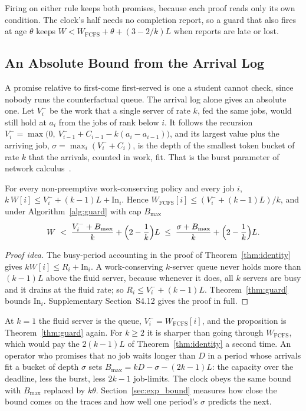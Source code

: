 Firing on either rule keeps both promises, because each proof reads only its own
condition. The clock's half needs no completion report, so a guard that also fires at
age $\theta$ keeps $W < W_{\mathrm{FCFS}} + \theta + (3-2/k)L$ when reports are late
or lost.

\subsection{An Absolute Bound from the Arrival Log}
\label{sec:absolute}

A promise relative to first-come first-served is one a student cannot check, since
nobody runs the counterfactual queue. The arrival log alone gives an absolute one. Let
$V_i^-$ be the work that a single server of rate $k$, fed the same jobs, would still hold
at $a_i$ from the jobs of rank below $i$. It follows the recursion
$V_i^- = \max\bigl(0,\ V_{i-1}^- + C_{i-1} - k(a_i - a_{i-1})\bigr)$, and its largest
value plus the arriving job, $\sigma = \max_i (V_i^- + C_i)$, is the depth of the
smallest token bucket of rate $k$ that the arrivals, counted in work, fit. That is the
burst parameter of network calculus~\cite{cruz1991calculus,leboudec2001network}.

\begin{proposition}
\label{prop:absolute}
For every non-preemptive work-conserving policy and every job $i$,
$k\,W[i] \le V_i^- + (k-1)L + \mathrm{In}_i$. Hence
$W_{\mathrm{FCFS}}[i] \le (V_i^- + (k-1)L)/k$, and under Algorithm~\ref{alg:guard}
with cap $B_{\max}$
\[
  W \;<\; \frac{V_i^- + B_{\max}}{k} + \Bigl(2 - \frac{1}{k}\Bigr)L
    \;\le\; \frac{\sigma + B_{\max}}{k} + \Bigl(2 - \frac{1}{k}\Bigr)L .
\]
\end{proposition}

\begin{proof}[Proof idea]
The busy-period accounting in the proof of Theorem~\ref{thm:identity} gives
$kW[i] \le R_i + \mathrm{In}_i$. A work-conserving $k$-server queue never holds more
than $(k-1)L$ above the fluid server, because whenever it does, all $k$ servers are
busy and it drains at the fluid rate; so $R_i \le V_i^- + (k-1)L$.
Theorem~\ref{thm:guard} bounds $\mathrm{In}_i$. Supplementary Section~S4.12 gives the
proof in full.
\end{proof}

At $k = 1$ the fluid server is the queue, $V_i^- = W_{\mathrm{FCFS}}[i]$, and the
proposition is Theorem~\ref{thm:guard} again. For $k \ge 2$ it is sharper than going
through $W_{\mathrm{FCFS}}$, which would pay the $2(k-1)L$ of
Theorem~\ref{thm:identity} a second time. An operator who promises that no job waits
longer than $D$ in a period whose arrivals fit a bucket of depth $\sigma$ sets
$B_{\max} = kD - \sigma - (2k-1)L$: the capacity over the deadline, less the burst,
less $2k-1$ job-limits. The clock obeys the same bound with $B_{\max}$ replaced by
$k\theta$. Section~\ref{sec:exp_bound} measures how close the bound comes on the traces
and how well one period's $\sigma$ predicts the next.
